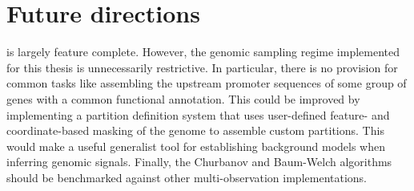 \section{Future directions}

 is largely feature complete. However, the genomic sampling regime implemented for this thesis is unnecessarily restrictive. In particular, there is no provision for common tasks like assembling the upstream promoter sequences of some group of genes with a common functional annotation. This could be improved by implementing a partition definition system that uses user-defined feature- and coordinate-based masking of the genome to assemble custom partitions. This would make  a useful generalist tool for establishing background models when inferring genomic signals. Finally, the Churbanov and Baum-Welch algorithms should be benchmarked against other multi-observation implementations.